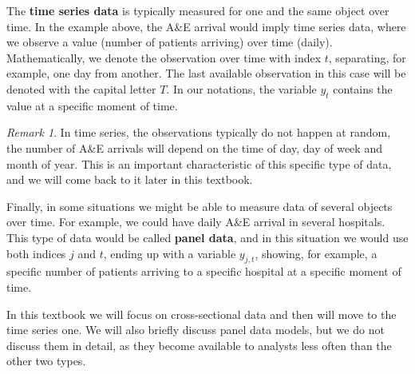 \documentclass[
]{book}
\theoremstyle{definition}
\theoremstyle{definition}
\theoremstyle{definition}
\theoremstyle{definition}
\theoremstyle{remark}
\newtheorem*{remark}{Remark}
\begin{document}
The \textbf{time series data} is typically measured for one and the same object over time. In the example above, the A\&E arrival would imply time series data, where we observe a value (number of patients arriving) over time (daily). Mathematically, we denote the observation over time with index \(t\), separating, for example, one day from another. The last available observation in this case will be denoted with the capital letter \(T\). In our notations, the variable \(y_t\) contains the value at a specific moment of time.

\begin{remark}
In time series, the observations typically do not happen at random, the number of A\&E arrivals will depend on the time of day, day of week and month of year. This is an important characteristic of this specific type of data, and we will come back to it later in this textbook.
\end{remark}

Finally, in some situations we might be able to measure data of several objects over time. For example, we could have daily A\&E arrival in several hospitals. This type of data would be called \textbf{panel data}, and in this situation we would use both indices \(j\) and \(t\), ending up with a variable \(y_{j,t}\), showing, for example, a specific number of patients arriving to a specific hospital at a specific moment of time.

In this textbook we will focus on cross-sectional data and then will move to the time series one. We will also briefly discuss panel data models, but we do not discuss them in detail, as they become available to analysts less often than the other two types.
\end{document}
